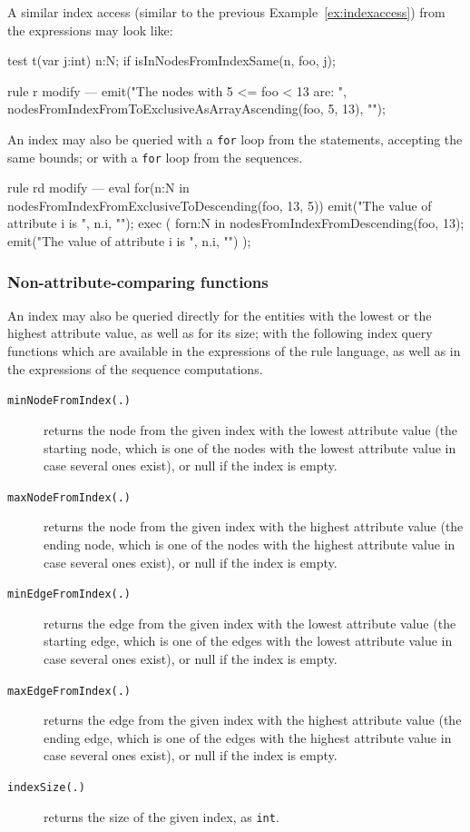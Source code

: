 \begin{example}
A similar index access (similar to the previous Example~\ref{ex:indexaccess}) from the expressions may look like:

\begin{grgen}
test t(var j:int) {
  n:N;
  if { isInNodesFromIndexSame(n, foo, j); }
}

rule r {
  modify {
  ---
    emit("The nodes with 5 <= foo < 13 are: ", nodesFromIndexFromToExclusiveAsArrayAscending(foo, 5, 13), "\n");
  }
}
\end{grgen}

An index may also be queried with a \texttt{for} loop from the statements, accepting the same bounds; 
or with a \texttt{for} loop from the sequences.

\begin{grgen}
rule rd {
  modify {
  ---
    eval {
      for(n:N in nodesFromIndexFromExclusiveToDescending(foo, 13, 5)) {
        emit("The value of attribute i is ", n.i, "\n");
      }
    }
    exec (
      for{n:N in nodesFromIndexFromDescending(foo, 13);
        { emit("The value of attribute i is ", n.i, "\n") }
      }
    );
  }
}
\end{grgen}

\end{example}


\subsubsection*{Non-attribute-comparing functions}

An index may also be queried directly for the entities with the lowest or the highest attribute value, as well as for its size;
with the following index query functions which are available in the expressions of the rule language, as well as in the expressions of the sequence computations.

\begin{description}
\item[\texttt{minNodeFromIndex(.)}] returns the node from the given index with the lowest attribute value (the starting node, which is one of the nodes with the lowest attribute value in case several ones exist), or null if the index is empty.
\item[\texttt{maxNodeFromIndex(.)}] returns the node from the given index with the highest attribute value (the ending node, which is one of the nodes with the highest attribute value in case several ones exist), or null if the index is empty.
\item[\texttt{minEdgeFromIndex(.)}] returns the edge from the given index with the lowest attribute value (the starting edge, which is one of the edges with the lowest attribute value in case several ones exist), or null if the index is empty.
\item[\texttt{maxEdgeFromIndex(.)}] returns the edge from the given index with the highest attribute value (the ending edge, which is one of the edges with the highest attribute value in case several ones exist), or null if the index is empty.
\item[\texttt{indexSize(.)}] returns the size of the given index, as \texttt{int}.
\end{description}


